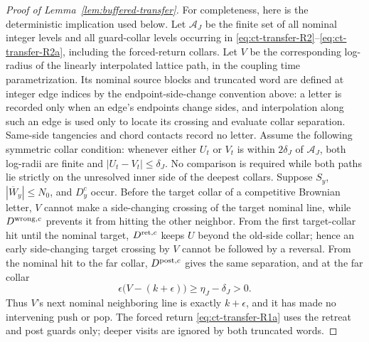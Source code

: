 \begin{proof}[Proof of Lemma~\ref{lem:buffered-transfer}]
For completeness, here is the deterministic implication used below.  Let
$\mathcal A_J$ be the finite set of all nominal integer levels and all
guard-collar levels occurring in \eqref{eq:ct-transfer-R2}--\eqref{eq:ct-transfer-R2a}, including the forced-return
collars.  Let $V$ be the corresponding log-radius of the linearly
interpolated lattice path, in the coupling time parametrization.  Its
nominal source blocks and truncated word are defined at integer edge indices
by the endpoint-side-change convention above: a letter is recorded only
when an edge's endpoints change sides, and interpolation along such an edge
is used only to locate its crossing and evaluate collar separation.
Same-side tangencies and chord contacts record no letter.  Assume the
following symmetric collar condition: whenever either $U_t$ or $V_t$ is
within $2\delta_J$ of $\mathcal A_J$, both log-radii are finite and
$|U_t-V_t|\le\delta_J$.  No comparison is required while both paths lie
strictly on the unresolved inner side of the deepest collars.  Suppose $S_y$,
$|\overline W_y|\le N_0$, and $D_y^c$ occur.  Before the target collar
of a competitive Brownian letter, $V$ cannot make a side-changing crossing
of the target nominal line, while $D^{{\rm wrong},c}$ prevents it from hitting the other
neighbor.  From the first target-collar hit until the nominal target,
$D^{{\rm ret},c}$ keeps $U$ beyond the old-side collar; hence an early
side-changing target crossing by $V$ cannot be followed by a reversal.  From the nominal
hit to the far collar, $D^{{\rm post},c}$ gives the same separation,
and at the far collar
\[
\epsilon\bigl(V-(k+\epsilon)\bigr)
       \ge\eta_J-\delta_J>0.
\]
Thus $V$'s next nominal neighboring line is exactly $k+\epsilon$,
and it has made no intervening push or pop.  The forced return \eqref{eq:ct-transfer-R1a} uses
the retreat and post guards only; deeper visits are ignored by both
truncated words.


\end{proof}
